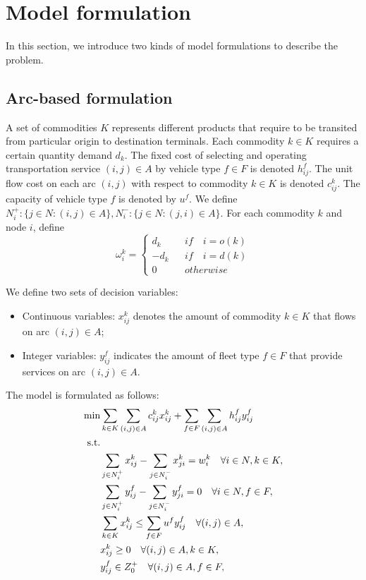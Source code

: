 \documentclass[11pt,nonblindrev,fleqn]{article}
\begin{document}
\section{Model formulation}
In this section, we introduce two kinds of model formulations to describe the problem. 

\subsection{Arc-based formulation}
A set of commodities $K$ represents different products that require to be transited from particular origin to destination terminals. Each commodity $k\in K$ requires a certain quantity demand $d_k$. The fixed cost of selecting and operating transportation service $(i,j)\in A$ by vehicle type $f\in F$ is denoted $h_{ij}^f$. The unit flow cost on each arc $(i,j)$ with respect to commodity $k\in K$ is denoted $c_{ij}^k$. The capacity of vehicle type $f$ is denoted by $u^f$. We define $N_i^+:\{j\in N:(i,j)\in A\},N_i^-:\{j\in N:(j,i)\in A\}$. For each commodity $k$ and node $i$, define
\begin{equation*}
\omega_i^k= \left\{
\begin{aligned}
d_k &  & if \quad i=o(k) \\
-d_k &  & if \quad i=d(k) \\
0 &  & otherwise
\end{aligned}
\right.
\end{equation*}

We define two sets of decision variables:
\begin{itemize}
  \item Continuous variables: $x_{ij}^k$ denotes the amount of commodity $k\in K$ that flows on arc $(i,j)\in A$;
  \item Integer variables: $y_{ij}^f$ indicates the amount of fleet type $f\in F$ that provide services on arc $(i,j)\in A$.
\end{itemize}

The model is formulated as follows:
\begin{align}
  \min & \sum_{k\in K}\sum_{(i,j)\in A} c_{ij}^k x_{ij}^k + \sum_{f\in F}\sum_{(i,j)\in A}h_{ij}^f y_{ij}^f    \label{objA}  \\
  \rm{s.t.} \nonumber  \\
         &  \sum_{j\in N_i^+}x_{ij}^k - \sum_{j\in N_i^-}x_{ji}^k = w_i^k     \quad     \forall i\in N, k\in K,     \label{demandA}  \\
         &   \sum_{j\in N_i^+}y_{ij}^f - \sum_{j\in N_i^-}y_{ji}^f = 0  \quad     \forall i\in N, f\in F,   \label{dbA} \\
         &   \sum_{k\in K}x_{ij}^k \leq \sum_{f\in F}u^f y_{ij}^f  \quad  \forall (i,j)\in A,   \label{capacityA} \\
         &    x_{ij}^k \geq 0  \quad  \forall (i,j)\in A, k\in K,   \label{xA} \\
         &   y_{ij}^f \in Z_0^+  \quad  \forall (i,j)\in A, f\in F, \label{yA}
\end{align}
\end{document}
